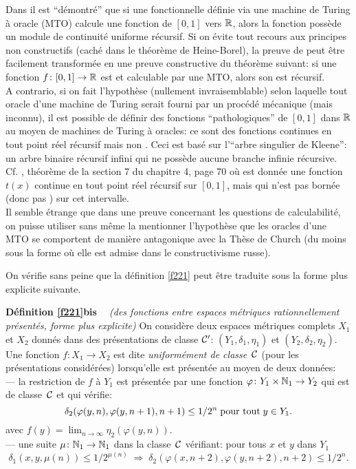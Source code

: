 \begin{fremark} \label{f225}
Dans \cite{fKF82}  il est ``démontré'' que si une fonctionnelle définie via 
une machine de Turing à oracle (MTO) calcule une fonction de  $[0,1]$  
vers  $\mathbb {R}$,  alors la fonction possède un module de continuité uniforme 
récursif. Si on évite tout recours aux principes non constructifs (caché 
dans le théorème de Heine-Borel), la preuve de \cite{fKF82} peut être 
facilement transformée en une preuve constructive du théorème suivant:  
si une fonction  $f\colon [0,1] \rightarrow \mathbb {R}$  est \unico et calculable par une MTO, alors son \mcu est récursif.\\ 
A contrario, si on fait l'hypothèse (nullement invraisemblable) selon laquelle tout oracle d'une machine de Turing serait fourni par un procédé mécanique (mais inconnu), il est possible de définir des fonctions ``pathologiques'' de  $[0,1]$  dans  $\mathbb {R}$  au moyen de machines de Turing à oracles: ce sont des fonctions continues en tout point réel récursif mais non \unicos. 
Ceci est basé sur l'``arbre singulier de Kleene'': un arbre binaire récursif infini qui ne possède aucune branche infinie récursive. Cf. \cite{fBe}, théorème de la section 7 du chapitre 4, page 70 où est donnée une fonction  $t(x)$  continue en tout point réel récursif sur $[0,1]$, mais qui n'est pas bornée (donc pas \unicoz) sur cet intervalle.
\\  
Il semble étrange que dans une preuve concernant les questions de 
calculabilité, on puisse utiliser sans même la mentionner l'hypothèse 
que les oracles d'une MTO se comportent de manière antagonique avec la 
Thèse de Church (du moins sous la forme où elle est admise dans le
 constructivisme russe).
\end{fremark}

On vérifie sans peine que la définition \ref{f221} peut être traduite sous 
la forme plus explicite suivante. 

\mni
{\bf Définition \ref{f221}bis  ~}
{\em (\com des fonctions \unicos entre espaces métriques rationnellement 
présentés, forme plus explicite)}
On considère deux espaces métriques complets  $X_1$  et  $X_2$  donnés 
dans  des présentations de classe  ${{\cal C}}'$:   $(Y_1,\delta_1,\eta_1)$  et  
$(Y_2,\delta_2,\eta_2).$  Une fonction \unico  $f \colon  X_1 \rightarrow X_2 $ est 
dite {\em  uniformément de classe~${{\cal C}}$}   (pour les présentations 
considérées) lorsqu'elle est présentée au moyen de deux données:\\
--- la restriction de  $f$  à $Y_1$   est présentée par une fonction   
$\varphi \colon  Y_1\times \mathbb {N}_1 \rightarrow Y_2$ qui est de classe~${{\cal C}}$   et qui vérifie:
$$\delta_2(\varphi(y,n),\varphi(y,n+1),n+1) \leq 1/2^n \; \hbox{pour tout} \; 
y \in Y_1.$$
avec $f(y)=\lim_{n\rightarrow \infty}\eta_2(\varphi(y,n))$.\\
--- une suite  $\mu\colon  \mathbb {N}_1  \rightarrow   \mathbb {N}_1$   dans la classe~${{\cal C}}$    
vérifiant:  pour tous  $x$  et  $y$  dans  $Y_1$
$$\delta_1(x,y,\mu(n))\le 1/2^{\mu(n)} \; \Rightarrow\;  
\delta_2(\varphi(x,n+2),\varphi(y,n+2),n+2) \leq 1/2^n.$$

